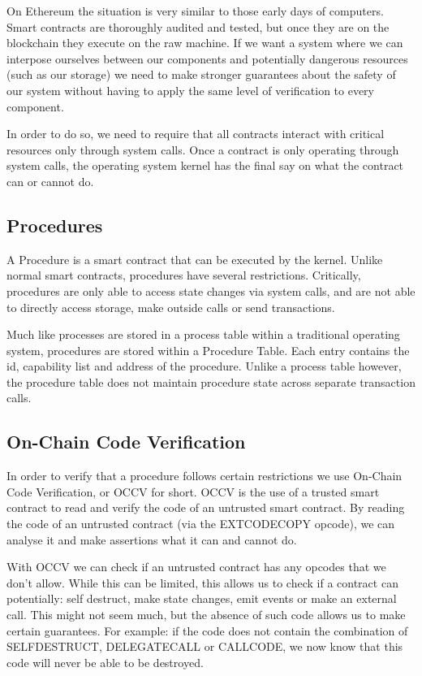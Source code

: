 \documentclass[english,a4paper]{article}
\begin{document}
On Ethereum the situation is very similar to those early days of
computers. Smart contracts are thoroughly audited and tested, but once
they are on the blockchain they execute on the raw machine. If we want a
system where we can interpose ourselves between our components and
potentially dangerous resources (such as our storage) we need to make
stronger guarantees about the safety of our system without having to
apply the same level of verification to every component.

In order to do so, we need to require that all contracts interact with
critical resources only through system calls. Once a contract is only
operating through system calls, the operating system kernel has the
final say on what the contract can or cannot do.

\subsection{Procedures}\label{procedures}
A Procedure is a smart contract that can be executed by the kernel.
Unlike normal smart contracts, procedures have several restrictions.
Critically, procedures are only able to access state changes via system
calls, and are not able to directly access storage, make outside calls
or send transactions.

Much like processes are stored in a process table within a traditional
operating system, procedures are stored within a Procedure Table. Each
entry contains the id, capability list and address of the procedure.
Unlike a process table however, the procedure table does not maintain
procedure state across separate transaction calls.

\subsection{On-Chain Code
Verification}\label{on-chain-code-verification}
In order to verify that a procedure follows certain restrictions we use
On-Chain Code Verification, or OCCV for short. OCCV is the use of a
trusted smart contract to read and verify the code of an untrusted smart
contract. By reading the code of an untrusted contract (via the EXTCODECOPY
opcode), we can analyse it and make assertions what it can and cannot do.

With OCCV we can check if an untrusted contract has any opcodes that we
don't allow. While this can be limited, this allows us to check if a
contract can potentially: self destruct, make state changes, emit events
or make an external call. This might not seem much, but the absence of
such code allows us to make certain guarantees. For example: if the code
does not contain the combination of SELFDESTRUCT, DELEGATECALL or
CALLCODE, we now know that this code will never be able to be destroyed.
\end{document}
